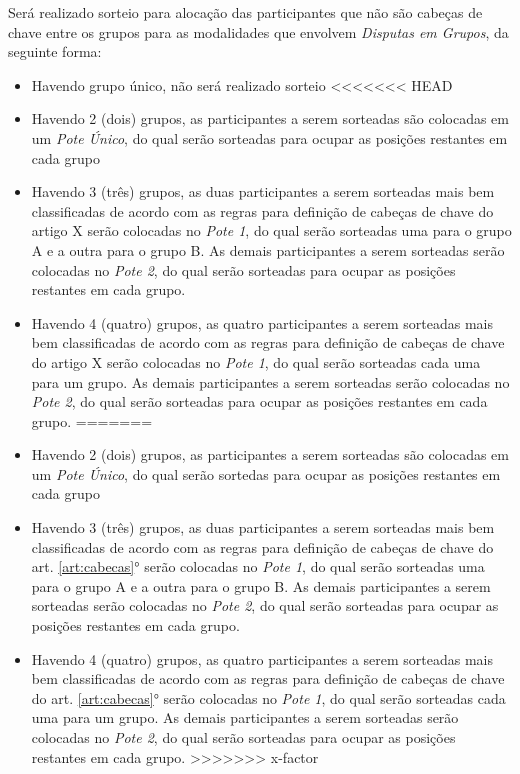\noindent
Será realizado sorteio para alocação das participantes que não são cabeças de chave entre os grupos para as modalidades que envolvem \textit{Disputas em Grupos}, da seguinte forma:
\begin{itemize}[noitemsep]
	\item Havendo grupo único, não será realizado sorteio
<<<<<<< HEAD
	\item Havendo 2 (dois) grupos, as participantes a serem sorteadas são colocadas em um \textit{Pote Único}, do qual serão sorteadas para ocupar as posições restantes em cada grupo
	\item Havendo 3 (três) grupos, as duas participantes a serem sorteadas mais bem classificadas de acordo com as regras para definição de cabeças de chave do artigo X serão colocadas no \textit{Pote 1}, do qual serão sorteadas uma para o grupo A e a outra para o grupo B. As demais participantes a serem sorteadas serão colocadas no \textit{Pote 2}, do qual serão sorteadas para ocupar as posições restantes em cada grupo.
	\item Havendo 4 (quatro) grupos, as quatro participantes a serem sorteadas mais bem classificadas de acordo com as regras para definição de cabeças de chave do artigo X serão colocadas no \textit{Pote 1}, do qual serão sorteadas cada uma para um grupo. As demais participantes a serem sorteadas serão colocadas no \textit{Pote 2}, do qual serão sorteadas para ocupar as posições restantes em cada grupo.
=======
	\item Havendo 2 (dois) grupos, as participantes a serem sorteadas são colocadas em um \textit{Pote Único}, do qual serão sortedas para ocupar as posições restantes em cada grupo
	\item Havendo 3 (três) grupos, as duas participantes a serem sorteadas mais bem classificadas de acordo com as regras para definição de cabeças de chave do art. \ref{art:cabecas}° serão colocadas no \textit{Pote 1}, do qual serão sorteadas uma para o grupo A e a outra para o grupo B. As demais participantes a serem sorteadas serão colocadas no \textit{Pote 2}, do qual serão sorteadas para ocupar as posições restantes em cada grupo.
	\item Havendo 4 (quatro) grupos, as quatro participantes a serem sorteadas mais bem classificadas de acordo com as regras para definição de cabeças de chave do art. \ref{art:cabecas}° serão colocadas no \textit{Pote 1}, do qual serão sorteadas cada uma para um grupo. As demais participantes a serem sorteadas serão colocadas no \textit{Pote 2}, do qual serão sorteadas para ocupar as posições restantes em cada grupo.
>>>>>>> x-factor
\end{itemize}

